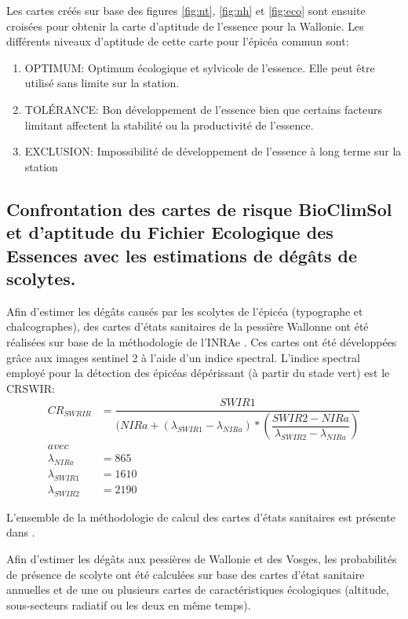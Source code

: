 Les cartes créés sur base des figures  \ref{fig:nt}, \ref{fig:nh} et \ref{fig:eco} sont ensuite croisées pour obtenir la carte d'aptitude de l'essence pour la Wallonie. 
Les différents niveaux d'aptitude de cette carte pour l'épicéa commun sont:

\begin{enumerate}
    \item OPTIMUM: Optimum écologique et sylvicole de l'essence. Elle peut être utilisé sans limite sur la station.
    \item TOLÉRANCE: Bon développement de l'essence bien que certains facteurs limitant affectent la stabilité ou la productivité de l'essence.
    \item EXCLUSION: Impossibilité de développement de l'essence à long terme sur la station 
\end{enumerate}

\newpage
\subsection{Confrontation des cartes de risque BioClimSol et d'aptitude du Fichier Ecologique des Essences avec les estimations de dégâts de scolytes.}
Afin d'estimer les dégâts causés par les scolytes de l'épicéa (typographe et chalcographes), des cartes d'états sanitaires de la pessière Wallonne ont été réalisées sur base de la méthodologie de l'INRAe \citep{dutrieux_mise_2021,dutrieux_package_2021}. Ces cartes ont été développées grâce aux images sentinel 2 à l'aide d'un indice spectral.
L'indice spectral employé pour la détection des épicéas dépérissant (à partir du stade vert) est le CRSWIR:
\begin{align*} 
CR_{SWRIR} &= \dfrac{SWIR1}{( NIRa + (\lambda_{SWIR1}-\lambda_{NIRa})* (\dfrac{SWIR2 - NIRa}{\lambda_{SWIR2}-\lambda_{NIRa}})} \\ 
avec&\\ 
\lambda_{NIRa} &=865\\ 
\lambda_{SWIR1} &=1610\\ 
\lambda_{SWIR2} &=2190
\end{align*} 

L'ensemble de la méthodologie de calcul des cartes d'états sanitaires est présente dans \cite{lisein_guide_2022}.

Afin d'estimer les dégâts aux pessières de Wallonie et des Vosges, les probabilités de présence de scolyte  ont été calculées sur base des cartes d'état sanitaire annuelles et de une ou  plusieurs cartes de caractéristiques écologiques (altitude, sous-secteurs radiatif ou les deux en même temps).

